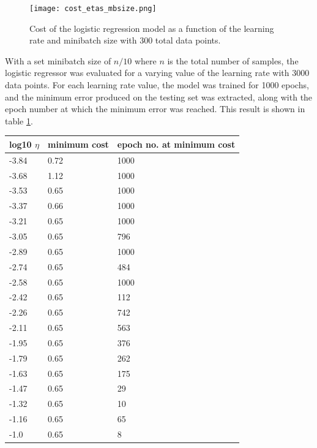 \documentclass[a4paper,10pt,english]{article}
\begin{document}
\begin{figure}
    \centering
    \texttt{[image: cost\_etas\_mbsize.png]}
    \caption{Cost of the logistic regression model as a function of the learning rate and minibatch size with 300 total data points.}
    \label{fig:logreg_minibatch}
\end{figure}

With a set minibatch size of $n/10$ where $n$ is the total number of samples, the logistic regressor was evaluated for a varying value of the learning rate with 3000 data points. For each learning rate value, the model was trained for 1000 epochs, and the minimum error produced on the testing set was extracted, along with the epoch number at which the minimum error was reached. This result is shown in table \ref{tab:logreg_etas}.

\begin{table}[] \centering
\begin{tabular}{|l|l|l|}
\hline
log10 $\eta$ & minimum cost & epoch no. at minimum cost \\ \hline
-3.84        & 0.72         & 1000                      \\ \hline
-3.68        & 1.12         & 1000                      \\ \hline
-3.53        & 0.65         & 1000                      \\ \hline
-3.37        & 0.66         & 1000                      \\ \hline
-3.21        & 0.65         & 1000                      \\ \hline
-3.05        & 0.65         & 796                       \\ \hline
-2.89        & 0.65         & 1000                      \\ \hline
-2.74        & 0.65         & 484                       \\ \hline
-2.58        & 0.65         & 1000                      \\ \hline
-2.42        & 0.65         & 112                       \\ \hline
-2.26        & 0.65         & 742                       \\ \hline
-2.11        & 0.65         & 563                       \\ \hline
-1.95        & 0.65         & 376                       \\ \hline
-1.79        & 0.65         & 262                       \\ \hline
-1.63        & 0.65         & 175                       \\ \hline
-1.47        & 0.65         & 29                        \\ \hline
-1.32        & 0.65         & 10                        \\ \hline
-1.16        & 0.65         & 65                        \\ \hline
-1.0         & 0.65         & 8                         \\ \hline
\end{tabular}
\label{tab:logreg_etas}
\end{table}
\end{document}

